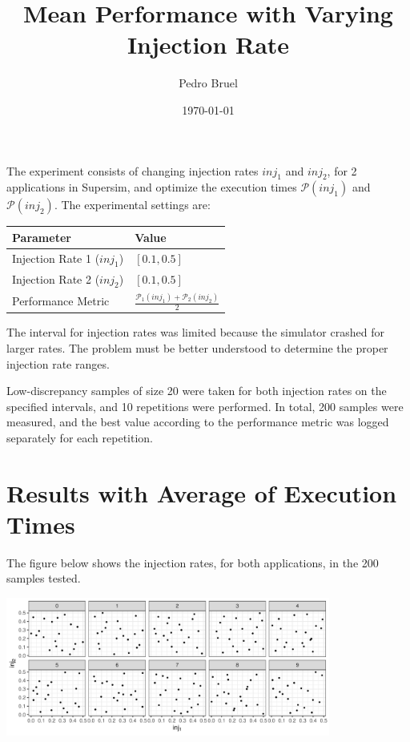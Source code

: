 \documentclass[a4paper]{article}
\author{Pedro Bruel}
\date{\today}
\title{Mean Performance with Varying Injection Rate}
\begin{document}
\maketitle
The experiment  consists of changing  injection rates  \(inj_1\) and \(inj_2\),  for 2
applications in  Supersim, and optimize the  execution times \(\mathcal{P}(inj_1)\)
and \(\mathcal{P}(inj_2)\).  The experimental settings are:

\begin{center}
\begin{tabular}{ll}
\hline
Parameter & Value\\
\hline
Injection Rate 1 (\(inj_1\)) & \([0.1, 0.5]\)\\
Injection Rate 2 (\(inj_2\)) & \([0.1, 0.5]\)\\
Performance Metric & \(\frac{\mathcal{P}_1(inj_1) + \mathcal{P}_2(inj_2)}{2}\)\\
\hline
\end{tabular}
\end{center}

The interval for  injection rates was limited because the  simulator crashed for
larger rates.   The problem must  be better  understood to determine  the proper
injection rate ranges.

Low-discrepancy samples  of size 20 were  taken for both injection  rates on the
specified intervals,  and 10 repetitions  were performed. In total,  200 samples
were measured, and the best value according to the performance metric was logged
separately for each repetition.

\section{Results with Average of Execution Times}
\label{sec:orgd8e077e}
The figure  below shows the injection  rates, for both applications,  in the 200
samples tested.

\begin{center}
\includegraphics[width=0.8\textwidth]{./img/2_apps_min_mean_time/rs_20_samples_10_iterations_injection_scatter.pdf}
\end{center}
\end{document}
